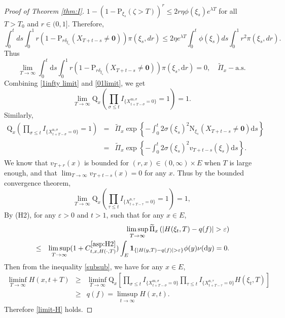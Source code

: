 \documentclass[12pt,a4paper]{amsart}
\numberwithin{equation}{section}
\theoremstyle{plain}
\theoremstyle{definition}
\theoremstyle{remark}
\begin{document}
\begin{proof}[Proof of Theorem \ref{thm:I}]
$1-(1-\mathrm P_{\xi_s}(\zeta>T))^r\leq 2r\eta \phi(\xi_s)e^{\lambda T}$ for all  $T>T_0$ and $r\in(0,1]$.
Therefore,
\[
\int_0^tds\int_0^1 r(1-\mathrm P_{r\delta_{ \xi_s}}(X_{T+t-s}\neq \mathbf 0))\pi(\xi_s,dr)\leq 2\eta e^{\lambda T}\int_0^t\phi(\xi_s)ds\int_0^1 r^2 \pi(\xi_s,dr).
\]
Thus
\begin{equation}\label{01limit}
\lim_{T\rightarrow\infty}\int_0^t\mathrm ds\int_0^1 r(1-\mathrm P_{r\delta_{\xi_s}}(X_{T+t-s}\neq \mathbf 0))\pi(\xi_s,\mathrm dr)=0, \quad \widetilde\Pi_x-\mbox{a.s.}
\end{equation}
 Combining \eqref{1infty limit} and \eqref{01limit}, we get
\[
\lim_{T\rightarrow\infty}\mathrm Q_{x}\left(\prod_{\sigma\leq t}I_{\{ X_{t+T-\sigma}^{{\mathrm m},\sigma}=0\}}=1\right)=1.
\]
Similarly,
\begin{eqnarray*}
\mathrm Q_x\left(\prod_{\sigma\leq t}I_{\{ X_{t+T-\sigma}^{{\mathrm n},\sigma}=0\}}=1\right)
&=&\widetilde\Pi_x\exp\left\{-\int_0^t2\sigma(\xi_s)^2\mathrm N_{\xi_s}(X_{T+t-s}\neq \mathbf 0)\mathrm ds\right\}\\
&=&\widetilde\Pi_x\exp\left\{-\int_0^t2\sigma(\xi_s)^2v_{T+t-s}(\xi_s)\mathrm ds\right\}.
\end{eqnarray*}
We know that $v_{T+r}(x)$ is  bounded for $(r,x)\in (0,\infty)\times E$ when $T$ is large enough, and that  $\lim_{T\rightarrow\infty} v_{T+t-s}(x)=0$ for any $x$.  Thus by the bounded convergence theorem, 
\[
\lim_{T\rightarrow\infty}\mathrm Q_x\left(\prod_{\tau\leq t}I_{\{ X_{t+T-\tau}^{{\mathrm n},\tau}=0\}}=1\right)=1,
\]
By (H2), 
for any $\varepsilon>0$ and $t>1$,
such that for any $x\in E$,
\begin{eqnarray*}
&&\limsup_{T\rightarrow\infty}\widetilde\Pi_x\left(|H(\xi_t, T)-q(f)|>\varepsilon\right)\\
&\leq& \limsup_{T\rightarrow\infty}(1+C^{\eqref{asp:H2}}_{t, x, H(\cdot, T)})\int_E\mathbf 1_{\{|H(y, T)-q(f)|>\varepsilon\}}\phi(y)\nu(\mathrm dy)=0.
\end{eqnarray*}
Then from the inequality \eqref{subsub}, we have for any $x\in E$,
\begin{eqnarray*}
\liminf_{T\rightarrow\infty}H(x, t+T)&\geq&  \liminf_{T\rightarrow\infty} \mathrm Q_x\left[\prod_{\sigma\leq t}I_{\{ X_{t+T-\sigma}^{{\mathrm m},\sigma}=0\}}\prod_{\tau\leq t}I_{\{ X_{t+T-\tau}^{{\mathrm n},\tau}=0\}}H(\xi_t, T)\right]\\
&\geq& q(f)=\limsup_{t\rightarrow\infty}H(x, t).
\end{eqnarray*}
 Therefore \eqref{limit-H} holds.


\end{proof}
\end{document}
